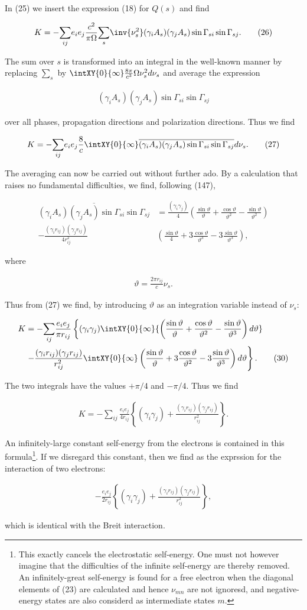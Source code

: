 \documentclass{article}
\newcommand{\nequ}[2]{
\begin{align*}
#1
\tag{#2}
\end{align*}
}
\newcommand{\uequ}[1]{
\begin{align*}
#1
\end{align*}
}
\newcommand{\sumX}[1]{\underset{#1}{\sum}}
\begin{document}
In (25) we insert the expression (18) for $Q(s)$ and find
\nequ{
K = -\sumX{ij}{e_i e_j \frac{c^2}{\pi\Omega}
 \sumX{s}{\inv{\nu_s^2}(\gamma_i A_s)(\gamma_j A_s)\sin\Gamma_{si} \sin\Gamma_{sj}}}.
}{26}
The sum over $s$ is transformed into an integral in the well-known manner by replacing $\sumX{s}$ by $\intXY{0}{\infty}\frac{8\pi}{c^3}\Omega\nu_s^2 {d\nu_s}$ and average the expression
\uequ{
(\gamma_i A_s)(\gamma_j A_s)\sin\Gamma_{si}\sin\Gamma_{sj}
}
over all phases, propagation directions and polarization directions. Thus we find
\nequ{
K = -\sumX{ij}{e_i e_j \frac{8}{c}\intXY{0}{\infty}\overline{
(\gamma_i A_s)(\gamma_j A_s)\sin\Gamma_{si}\sin\Gamma_{sj}
}{d\nu_s}}.
}{27}
The averaging can now be carried out without further ado. By a calculation that raises no fundamental difficulties, we find, following \cite{5} (147),
\nequ{
\overline{(\gamma_i A_s)(\gamma_j A_s)\sin\Gamma_{si}\sin\Gamma_{sj}} &=
\frac{(\gamma_i \gamma_j)}{4}\left(
\frac{\sin\vartheta}{\vartheta} + \frac{\cos\vartheta}{\vartheta^2} 
- \frac{\sin\vartheta}{\vartheta^2}\right)\\
- \frac{(\gamma_i r_{ij})(\gamma_j r_{ij})}{4r_{ij}^2}&\left(
\frac{\sin\vartheta}{4} + 3\frac{\cos\vartheta}{\vartheta^3} - 3\frac{\sin\vartheta}{\vartheta^3}
\right),
}{28}
where
\nequ{
\vartheta = \frac{2\pi r_{ij}}{c}\nu_s.
}{29}
Thus from (27) we find, by introducing $\vartheta$ as an integration variable instead of $\nu_s$:
\nequ{
K &= -\sumX{ij}\frac{e_i e_j}{\pi r_{ij}}\left\{(\gamma_i \gamma_j)
\intXY{0}{\infty}{\left(
\frac{\sin\vartheta}{\vartheta} + \frac{\cos\vartheta}{\vartheta^2} 
- \frac{\sin\vartheta}{\vartheta^3}\right){d\vartheta}} \right.\\
&\left. - \frac{(\gamma_i r_{ij})(\gamma_j r_{ij})}{r_{ij}^2}
\intXY{0}{\infty}\left(
\frac{\sin\vartheta}{\vartheta} + 3\frac{\cos\vartheta}{\vartheta^2} 
- 3\frac{\sin\vartheta}{\vartheta^3}\right){d\vartheta}\right\}.
}{30}
The two integrals have the values $+\pi/4$ and $-\pi/4$. Thus we find
\nequ{
K = -\sumX{ij}{\frac{e_i e_j}{4r_{ij}}\left\{
(\gamma_i \gamma_j) + \frac{(\gamma_i r_{ij})(\gamma_j r_{ij})}{r_{ij}^2}
\right\}}.
}{31}
An infinitely-large constant self-energy from the electrons is contained in this formula\footnote{This exactly cancels the electrostatic self-energy. One must not however imagine that the difficulties of the infinite self-energy are thereby removed. An infinitely-great self-energy is found for a free electron when the diagonal elements of (23) are calculated and hence $\nu_{mn}$ are not ignoresd, and negative-energy states are also considerd as intermediate states $m$.}. If we disregard this constant, then we find as the exprssion for the interaction of two electrons:
\nequ{
-\frac{e_i e_j}{2r_{ij}}\left\{(\gamma_i \gamma_j) + 
\frac{(\gamma_i r_{ij})(\gamma_j r_{ij})}{r_{ij}^2}\right\},
}{32}
which is identical with the Breit interaction.
\end{document}
